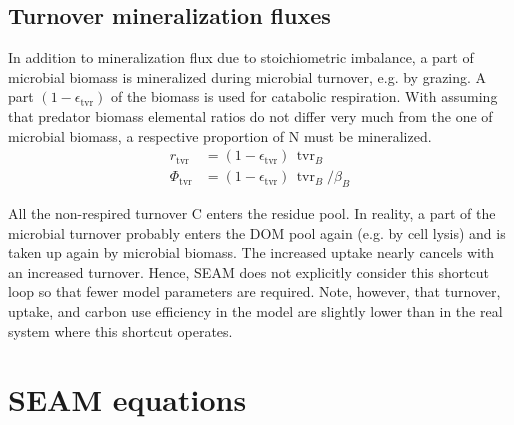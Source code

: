 \subsection{Turnover mineralization fluxes \label{sec:Tvr}}
In addition to mineralization flux due to stoichiometric imbalance, a part of
microbial biomass is mineralized during microbial turnover, e.g. by grazing. A
part $(1-\epsilon_{\operatorname{tvr}})$ of the biomass is used for catabolic
respiration. With assuming that predator biomass elemental ratios do not differ
very much from the one of microbial biomass, a respective proportion of N must
be mineralized.
\begin{subequations}
\label{eq:MinTvrB}
\begin{align} 
r_{\operatorname{tvr}} &= (1-\epsilon_{\operatorname{tvr}}) \,
\operatorname{tvr}_B
\\
\label{eq:PhiTvr}
\Phi_{\operatorname{tvr}} &=
(1-\epsilon_{\operatorname{tvr}}) \, \operatorname{tvr}_B / \beta_B
\end{align}
\end{subequations}

All the non-respired turnover C enters the residue pool. In reality, a part
of the microbial turnover probably enters the DOM pool again (e.g. by cell
lysis) and is taken up again by microbial biomass. The increased uptake nearly
cancels with an increased turnover. Hence, SEAM does not explicitly consider this
shortcut loop so that fewer model parameters are required.
Note, however, that turnover, uptake, and carbon use efficiency in the model are
slightly lower than in the real system where this shortcut operates.


\section{\hspace*{-7mm}  SEAM equations \label{app:fAlphaFix}}    %


